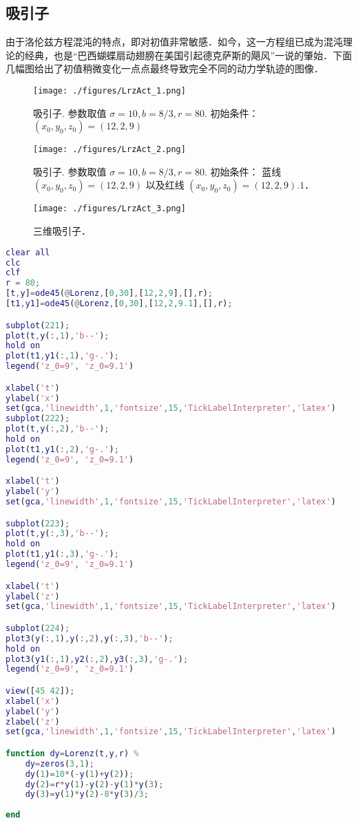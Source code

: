 \subsection{吸引子}
由于洛伦兹方程混沌的特点，即对初值非常敏感．如今，这一方程组已成为混沌理论的经典，也是“巴西蝴蝶扇动翅膀在美国引起德克萨斯的飓风”一说的肇始．下面几幅图给出了初值稍微变化一点点最终导致完全不同的动力学轨迹的图像．


\begin{figure}[ht]
\centering
\texttt{[image: ./figures/LrzAct\_1.png]}
\caption{吸引子. 参数取值 $\sigma=10,b=8/3, r=80$. 初始条件： $(x_0,y_0,z_0)=(12,2,9)$} \label{LrzAct_fig1}
\end{figure}

\begin{figure}[ht]
\centering
\texttt{[image: ./figures/LrzAct\_2.png]}
\caption{吸引子. 参数取值 $\sigma=10,b=8/3, r=80$. 初始条件： 蓝线 $(x_0,y_0,z_0)=(12,2,9)$ 以及红线 $(x_0,y_0,z_0)=(12,2,9).1$．} \label{LrzAct_fig2}
\end{figure}

\begin{figure}[ht]
\centering
\texttt{[image: ./figures/LrzAct\_3.png]}
\caption{三维吸引子．} \label{LrzAct_fig3}
\end{figure}

\begin{lstlisting}[language=matlab]
clear all
clc
clf
r = 80;
[t,y]=ode45(@Lorenz,[0,30],[12,2,9],[],r);
[t1,y1]=ode45(@Lorenz,[0,30],[12,2,9.1],[],r);

subplot(221);
plot(t,y(:,1),'b--');
hold on
plot(t1,y1(:,1),'g-.');
legend('z_0=9', 'z_0=9.1')

xlabel('t')
ylabel('x')
set(gca,'linewidth',1,'fontsize',15,'TickLabelInterpreter','latex')
subplot(222);
plot(t,y(:,2),'b--');
hold on
plot(t1,y1(:,2),'g-.');
legend('z_0=9', 'z_0=9.1')

xlabel('t')
ylabel('y')
set(gca,'linewidth',1,'fontsize',15,'TickLabelInterpreter','latex')

subplot(223);
plot(t,y(:,3),'b--');
hold on
plot(t1,y1(:,3),'g-.');
legend('z_0=9', 'z_0=9.1')

xlabel('t')
ylabel('z')
set(gca,'linewidth',1,'fontsize',15,'TickLabelInterpreter','latex')

subplot(224);
plot3(y(:,1),y(:,2),y(:,3),'b--');
hold on
plot3(y1(:,1),y2(:,2),y3(:,3),'g-.');
legend('z_0=9', 'z_0=9.1')

view([45 42]);
xlabel('x')
ylabel('y')
zlabel('z')
set(gca,'linewidth',1,'fontsize',15,'TickLabelInterpreter','latex')

function dy=Lorenz(t,y,r) %
    dy=zeros(3,1);
    dy(1)=10*(-y(1)+y(2));
    dy(2)=r*y(1)-y(2)-y(1)*y(3);
    dy(3)=y(1)*y(2)-8*y(3)/3;
    
end
\end{lstlisting}

